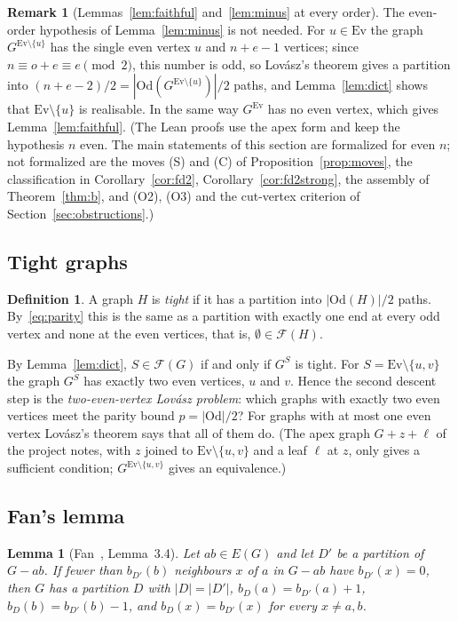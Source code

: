 \documentclass[11pt]{amsart}
\newtheorem{lemma}[theorem]{Lemma}
\theoremstyle{definition}
\newtheorem{definition}[theorem]{Definition}
\newtheorem{remark}[theorem]{Remark}
\newcommand{\cF}{\mathcal F}
\newcommand{\Ev}{\mathrm{Ev}}
\newcommand{\Od}{\mathrm{Od}}
\begin{document}
\begin{remark}[Lemmas~\ref{lem:faithful} and~\ref{lem:minus} at every order]\label{rem:anyorder}
The even-order hypothesis of Lemma~\ref{lem:minus} is not needed. For $u\in\Ev$ the graph
$G^{\Ev\setminus\{u\}}$ has the single even vertex $u$ and $n+e-1$ vertices; since $n\equiv o+e\equiv
e\pmod 2$, this number is odd, so Lov\'asz's theorem gives a partition into
$(n+e-2)/2=|\Od(G^{\Ev\setminus\{u\}})|/2$ paths, and Lemma~\ref{lem:dict} shows that
$\Ev\setminus\{u\}$ is realisable. In the same way $G^{\Ev}$ has no even vertex, which gives
Lemma~\ref{lem:faithful}. (The Lean proofs use the apex form and keep the hypothesis $n$ even. The main statements of this
section are formalized for even $n$; not formalized are the moves (S) and (C) of
Proposition~\ref{prop:moves}, the classification in Corollary~\ref{cor:fd2},
Corollary~\ref{cor:fd2strong}, the assembly of Theorem~\ref{thm:b}, and (O2), (O3) and the
cut-vertex criterion of Section~\ref{sec:obstructions}.)
\end{remark}

\subsection{Tight graphs}

\begin{definition}
A graph $H$ is \emph{tight} if it has a partition into $|\Od(H)|/2$ paths. By~\eqref{eq:parity} this
is the same as a partition with exactly one end at every odd vertex and none at the even vertices,
that is, $\emptyset\in\cF(H)$.
\end{definition}

By Lemma~\ref{lem:dict}, $S\in\cF(G)$ if and only if $G^S$ is tight. For $S=\Ev\setminus\{u,v\}$ the
graph $G^S$ has exactly two even vertices, $u$ and $v$. Hence the second descent step is the
\emph{two-even-vertex Lov\'asz problem}: which graphs with exactly two even vertices meet the
parity bound $p=|\Od|/2$? For graphs with at most one even vertex Lov\'asz's theorem says that all
of them do. (The apex graph $G+z+\ell$ of the project notes, with $z$ joined to $\Ev\setminus\{u,v\}$ and a
leaf $\ell$ at $z$, only gives a sufficient condition; $G^{\Ev\setminus\{u,v\}}$ gives an
equivalence.)

\subsection{Fan's lemma}

\begin{lemma}[Fan~\cite{Fan}, Lemma~3.4]\label{lem:fan-b}
Let $ab\in E(G)$ and let $D'$ be a partition of $G-ab$. If fewer than $b_{D'}(b)$ neighbours $x$ of
$a$ in $G-ab$ have $b_{D'}(x)=0$, then $G$ has a partition $D$ with $|D|=|D'|$,
$b_D(a)=b_{D'}(a)+1$, $b_D(b)=b_{D'}(b)-1$, and $b_D(x)=b_{D'}(x)$ for every $x\ne a,b$.
\end{lemma}
\end{document}
